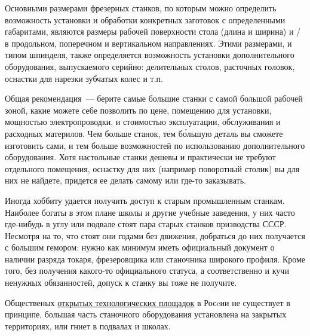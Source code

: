 Основными размерами фрезерных станков, по которым можно определить возможность
установки и обработки конкретных заготовок с определенными габаритами, являются
размеры рабочей поверхности стола (длина и ширина) и / в продольном, поперечном и вертикальном направлениях.
Этими размерами, и типом шпинделя, также определяется возможность установки
дополнительного оборудования, выпускаемого серийно: делительных столов,
расточных головок, оснастки для нарезки зубчатых колес и т.п.

\bigskip

Общая рекомендация\ --- берите самые большие станки с самой большой рабочей
зоной, какие можете себе позволить по цене, помещению для установки, мощностью
электропроводки, и стоимостью эксплуатации, обслуживания и расходных материлов.
Чем больше станок, тем б\'{о}льшую деталь вы сможете изготовить сами, и тем
больше возможностей по использованию дополнительного оборудования. Хотя
настольные станки дешевы и практически не требуют отдельного помещения, оснастку
для них (например поворотный столик) вы для них не найдете, придется ее делать
самому или где-то заказывать.





\secdown

Иногда хоббиту удается получить доступ к старым промышленным станкам. Наиболее
богаты в этом плане школы и другие учебные заведения, у них часто где-нибудь в
углу или подвале стоят пара старых станков призводства СССР. Несмотря на то, что
стоят они годами без движения, добраться до них получается с большим гемором:
нужно как минимум иметь официальный документ о наличии разряда токаря,
фрезеровщика или станочника широкого профиля. Кроме того, без получения
какого-то официального статуса, а соответственно и кучи ненужных обязанностей,
допуск к станку вы тоже не получите.

Общественых
\href{https://github.com/ponyatov/CHBZ/blob/master/presentation.pdf?raw=true}{открытых
технологических площадок} в Росcии не существует в принципе, большая часть
станочного оборудования установлена на закрытых территориях, или гниет в
подвалах и школах. 





\secup

\secup

